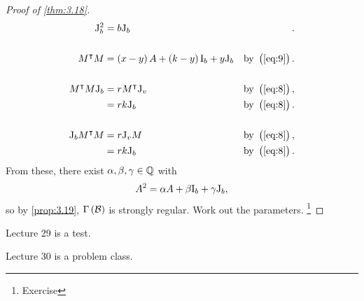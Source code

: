 \begin{proof}[Proof of \ref{thm:3.18}]
\begin{align*}
\J_b^2
& = b\J_b & . \\
\\
M^\intercal M
& = \br{x - y}A + \br{k - y}\I_b + y\J_b & \text{by} \ \br{\ref{eq:9}}. \\
\\
M^\intercal M\J_b
& = rM^\intercal \J_v & \text{by} \ \br{\ref{eq:8}}, \\
& = rk\J_b & \text{by} \ \br{\ref{eq:8}}. \\
\\
\J_bM^\intercal M
& = r\J_vM & \text{by} \ \br{\ref{eq:8}}, \\
& = rk\J_b & \text{by} \ \br{\ref{eq:8}}.
\end{align*}
From these, there exist $ \alpha, \beta, \gamma \in \mathbb{Q} $ with
$$ A^2 = \alpha A + \beta\mathrm{I}_b + \gamma\mathrm{J}_b, $$
so by \ref{prop:3.19}, $ \Gamma\br{\BBB} $ is strongly regular. Work out the parameters. \footnote{Exercise}
\end{proof}


Lecture 29 is a test.


Lecture 30 is a problem class.

